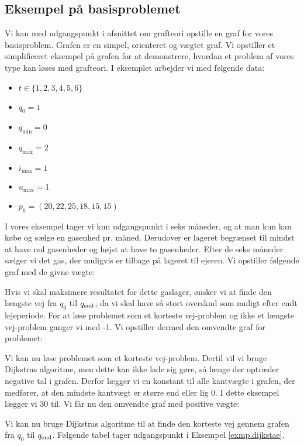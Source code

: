 \subsection{Eksempel på basisproblemet} \label{kap:graf_basis}
Vi kan med udgangspunkt i afsnittet om grafteori opstille en graf for vores basisproblem. Grafen er en simpel, orienteret og vægtet graf. Vi opstiller et simplificeret eksempel på grafen for at demonstrere, hvordan et problem af vores type kan løses med grafteori. I eksemplet arbejder vi med følgende data:
\begin{itemize}
  \item $t \in \{1,2,3,4,5,6\}$
  \item $q_{0}=1$
  \item $q_{\min}=0$
  \item $q_{\max}=2$
  \item $i_{\max}=1$
  \item $u_{\max}=1$
  \item $p_{6}=(20,22,25,18,15,15)$
\end{itemize}

I vores eksempel tager vi kun udgangspunkt i seks måneder, og at man kun kan købe og sælge en gasenhed pr. måned. Derudover er lageret begrænset til mindst at have nul gasenheder og højst at have to gasenheder. Efter de seks måneder sælger vi det gas, der muligvis er tilbage på lageret til ejeren. Vi opstiller følgende graf med de givne vægte:



Hvis vi skal maksimere resultatet for dette gaslager, ønsker vi at finde den længste vej fra $q_{0}$ til $q_{\textrm{end}}$, da vi skal have så stort overskud som muligt efter endt lejeperiode. For at løse problemet som et korteste vej-problem og ikke et længste vej-problem ganger vi med -1. Vi opstiller dermed den omvendte graf for problemet:



Vi kan nu løse problemet som et korteste vej-problem. Dertil vil vi bruge Dijkstras algoritme, men dette kan ikke lade sig gøre, så længe der optræder negative tal i grafen. Derfor lægger vi en konstant til alle kantvægte i grafen, der medfører, at den mindste kantvægt er større end eller lig 0. I dette eksempel lægger vi 30 til. Vi får nu den omvendte graf med positive vægte:




Vi kan nu bruge Dijkstras algoritme til at finde den korteste vej gennem grafen fra $q_0$ til $q_{\textrm{end}}$. Følgende tabel tager udgangspunkt i Eksempel \ref{exmp.dijkstae}.

